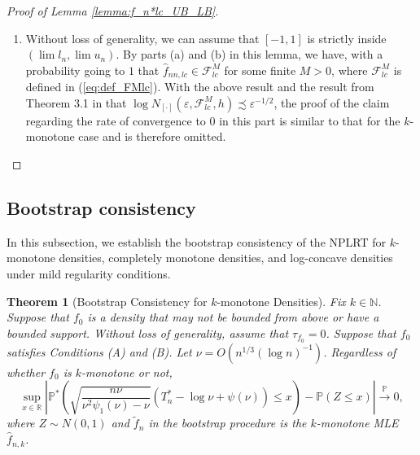 \documentclass[12pt,letterpaper, twoside, openany]{article}
\theoremstyle{plain}
\newtheorem{theorem}{Theorem}[section]
\begin{document}
\begin{proof}[Proof of Lemma \ref{lemma:f_n*lc_UB_LB}]
\begin{enumerate}
	
	\item [(c)]
	Without loss of generality, we can assume that $[-1,1]$ is strictly inside $(\lim l_n, \lim u_n)$. By parts (a) and (b) in this lemma, we have, with a probability going to $1$ that $\hat{f}_{nn,lc} \in \mathcal{F}^M_{lc}$ for some finite $M > 0$, where $\mathcal{F}^M_{lc}$ is defined in  (\ref{eq:def_FMlc}). With the above result and the result from Theorem 3.1 in \cite{doss2016global} that $\log N_{[\cdot]}(\varepsilon, \mathcal{F}^M_{lc},h) \precsim \varepsilon^{-1/2}$, the proof of the claim regarding the rate of convergence to $0$ in this part is similar to that for the $k$-monotone case and is therefore omitted. 
\end{enumerate}


\end{proof}




\subsection{Bootstrap consistency}
In this subsection, we establish the bootstrap consistency of the NPLRT for $k$-monotone densities, completely monotone densities, and log-concave densities under mild regularity conditions.

\begin{theorem}[Bootstrap Consistency for $k$-monotone Densities]\label{thm:bootstrap_consistency_k_monotone}
Fix $k \in \mathbb{N}$. Suppose that $f_0$ is a density that may not be bounded from above or have a bounded support. Without loss of generality, assume that $\tau_{f_0} = 0$. Suppose that $f_0$ satisfies Conditions (A) and (B). Let $\nu = O(n^{1/3}(\log n)^{-1})$.
Regardless of whether $f_0$ is $k$-monotone or not, 
\begin{equation*}
	\sup_{x \in \mathbb{R}} \left| \mathbb{P}^* \left( \sqrt{ \frac{n\nu}{\nu^2\psi_1(\nu)-\nu}} \left( T_n^* -  \log \nu +  \psi(\nu) \right)  \leq x\right) - \mathbb{P}(Z \leq x ) \right| \stackrel{\mathbb{P}}{\rightarrow} 0,
\end{equation*}
where $Z \sim N(0, 1)$  and $\tilde{f}_n$ in the bootstrap procedure is the $k$-monotone MLE $\hat{f}_{n,k}$.
\end{theorem}
\end{document}
